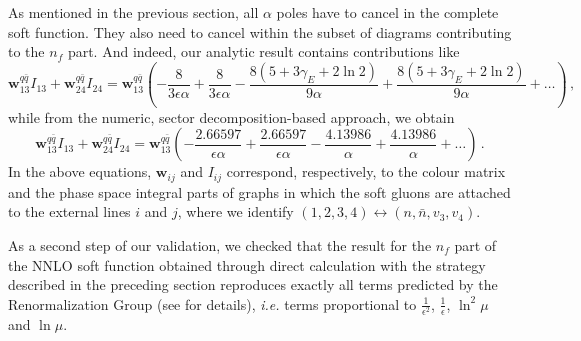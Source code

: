 \documentclass{PoS}
\newcommand{\qbar}{\ensuremath{\bar q}\xspace}
\newcommand{\bfw}{\bm{w}}
\newcommand{\gammaE}{\gamma_E}
\newcommand{\ie}{{\it i.e. }}
\begin{document}
As mentioned in the previous section, all $\alpha$ poles have to cancel in the
complete soft function. They also need to cancel within the subset of diagrams
contributing to the $n_f$ part. And indeed, our analytic result contains
contributions like
%
\begin{equation}
  \bfw_{13}^{q\qbar} I_{13} + \bfw_{24}^{q\qbar} I_{24}   =
  \bfw_{13}^{q\qbar} \left(
  -\frac{8}{3\epsilon\alpha} +\frac{8}{3\epsilon\alpha}
  -\frac{8(5+3\gammaE+2\ln2)}{9\alpha}
  +\frac{8(5+3\gammaE+2\ln2)}{9\alpha}
  + \ldots
  \right)\,,
\end{equation}
%
while from the numeric, sector decomposition-based approach, we obtain
%
\begin{equation}
  \bfw_{13}^{q\qbar} I_{13} + \bfw_{24}^{q\qbar} I_{24}   =
  \bfw_{13}^{q\qbar} \left(
  -\frac{2.66597}{\epsilon\alpha} +\frac{2.66597}{\epsilon\alpha}
  -\frac{4.13986}{\alpha}
  +\frac{4.13986}{\alpha}
  + \ldots
  \right)\,.  
\end{equation}
%
In the above equations, $\bfw_{ij}$ and $I_{ij}$ correspond, respectively, to
the colour matrix and the phase space integral parts of graphs in which the soft
gluons are attached to the external lines $i$ and $j$, where we identify
$(1,2,3,4) \leftrightarrow (n,\bar n, v_3, v_4)$.

As a second step of our validation, we checked that the result for the $n_f$
part of the NNLO soft function obtained through direct calculation with the
strategy described in the preceding section reproduces exactly all terms
predicted by the Renormalization Group (see \cite{Li:2013mia, Ferroglia:2012uy}
for details), \ie terms proportional to $\displaystyle \frac{1}{\epsilon^2}$,
$\displaystyle \frac{1}{\epsilon}$, $\ln^2\mu$ and $\ln\mu$.
\end{document}
